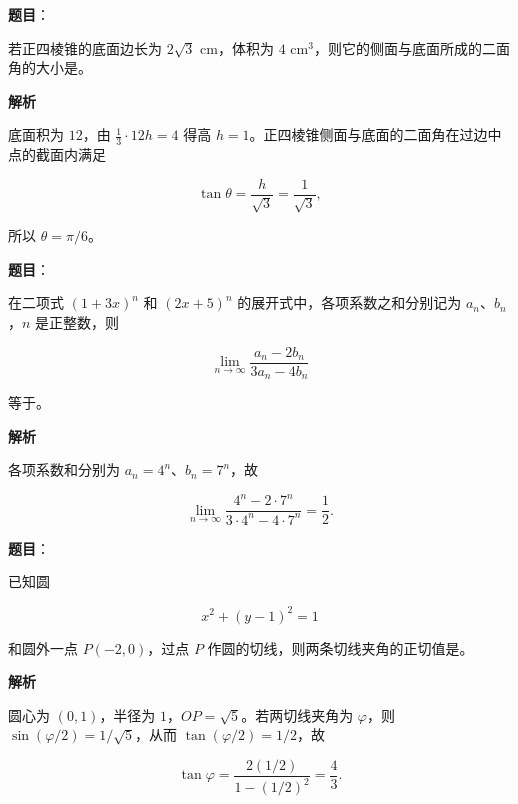 \begin{answer}

\textbf{题目}：

若正四棱锥的底面边长为 $2\sqrt3\text{ cm}$，体积为 $4\text{ cm}^3$，则它的侧面与底面所成的二面角的大小是\gkblank{}。

\textbf{解析}

底面积为 $12$，由 $\frac13\cdot12h=4$ 得高 $h=1$。正四棱锥侧面与底面的二面角在过边中点的截面内满足

\nopagebreak[4]
\[
\tan\theta=\frac{h}{\sqrt3}=\frac1{\sqrt3},
\]

所以 $\theta=\pi/6$。


\end{answer}
\begin{answer}

\textbf{题目}：

在二项式 $(1+3x)^n$ 和 $(2x+5)^n$ 的展开式中，各项系数之和分别记为 $a_n\text{、}b_n$，$n$ 是正整数，则

\nopagebreak[4]
\[
\lim_{n\to\infty}\frac{a_n-2b_n}{3a_n-4b_n}
\]

等于\gkblank{}。

\textbf{解析}

各项系数和分别为 $a_n=4^n$、$b_n=7^n$，故

\nopagebreak[4]
\[
\lim_{n\to\infty}\frac{4^n-2\cdot7^n}{3\cdot4^n-4\cdot7^n}
=\frac12.
\]


\end{answer}
\begin{answer}

\textbf{题目}：

已知圆

\nopagebreak[4]
\[
x^2+(y-1)^2=1
\]

和圆外一点 $P(-2,0)$，过点 $P$ 作圆的切线，则两条切线夹角的正切值是\gkblank{}。

\textbf{解析}

圆心为 $(0,1)$，半径为 $1$，$OP=\sqrt5$。若两切线夹角为 $\varphi$，则 $\sin(\varphi/2)=1/\sqrt5$，从而 $\tan(\varphi/2)=1/2$，故

\nopagebreak[4]
\[
\tan\varphi=\frac{2(1/2)}{1-(1/2)^2}=\frac43.
\]


\end{answer}
